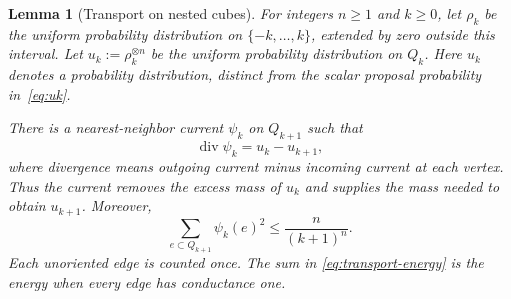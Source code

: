 \documentclass[conference]{IEEEtran}
\newtheorem{lemma}{Lemma}
\begin{document}
\begin{lemma}[Transport on nested cubes]
\label{lem:transport}
For integers $n\ge1$ and $k\ge0$, let $\rho_k$ be the uniform
probability distribution on $\{-k,\dots,k\}$, extended by zero
outside this interval. Let $u_k:=\rho_k^{\otimes n}$ be the
uniform probability distribution on $Q_k$. Here $u_k$ denotes a
probability distribution, distinct from the scalar proposal
probability in~\eqref{eq:uk}.

There is a nearest-neighbor current $\psi_k$ on $Q_{k+1}$ such that
\[
\operatorname{div}\psi_k=u_k-u_{k+1},
\]
where divergence means outgoing current minus incoming current
at each vertex. Thus the current removes the excess mass of $u_k$
and supplies the mass needed to obtain $u_{k+1}$. Moreover,
\begin{equation}
\label{eq:transport-energy}
\sum_{e\subset Q_{k+1}}\psi_k(e)^2
\le \frac{n}{(k+1)^n}.
\end{equation}
Each unoriented edge is counted once. The sum in
\eqref{eq:transport-energy} is the energy when every edge has
conductance one.
\end{lemma}
\end{document}
